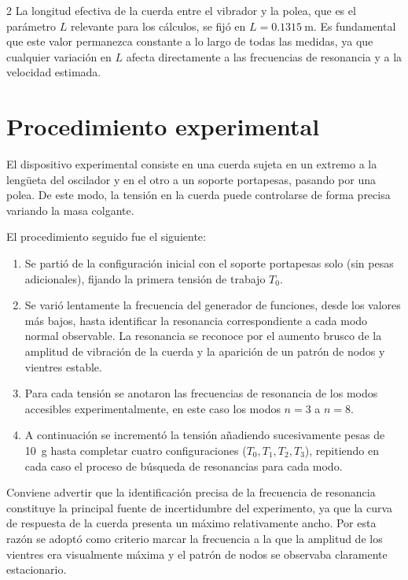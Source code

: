 \documentclass[12pt,a4paper]{article}
\newcommand{\Lutil}{\SI{0.1315}{\metre}}
\begin{document}
\begin{multicols}{2}
La longitud efectiva de la cuerda entre el vibrador y la polea, que es el parámetro $L$ relevante para los cálculos, se fijó en $L = \Lutil$. Es fundamental que este valor permanezca constante a lo largo de todas las medidas, ya que cualquier variación en $L$ afecta directamente a las frecuencias de resonancia y a la velocidad estimada.

\section{Procedimiento experimental}

El dispositivo experimental consiste en una cuerda sujeta en un extremo a la lengüeta del oscilador y en el otro a un soporte portapesas, pasando por una polea. De este modo, la tensión en la cuerda puede controlarse de forma precisa variando la masa colgante.

El procedimiento seguido fue el siguiente:

\begin{enumerate}
  \item Se partió de la configuración inicial con el soporte portapesas solo (sin pesas adicionales), fijando la primera tensión de trabajo $T_0$.
  \item Se varió lentamente la frecuencia del generador de funciones, desde los valores más bajos, hasta identificar la resonancia correspondiente a cada modo normal observable. La resonancia se reconoce por el aumento brusco de la amplitud de vibración de la cuerda y la aparición de un patrón de nodos y vientres estable.
  \item Para cada tensión se anotaron las frecuencias de resonancia de los modos accesibles experimentalmente, en este caso los modos $n = 3$ a $n = 8$.
  \item A continuación se incrementó la tensión añadiendo sucesivamente pesas de \SI{10}{\gram} hasta completar cuatro configuraciones ($T_0, T_1, T_2, T_3$), repitiendo en cada caso el proceso de búsqueda de resonancias para cada modo.
\end{enumerate}

Conviene advertir que la identificación precisa de la frecuencia de resonancia constituye la principal fuente de incertidumbre del experimento, ya que la curva de respuesta de la cuerda presenta un máximo relativamente ancho. Por esta razón se adoptó como criterio marcar la frecuencia a la que la amplitud de los vientres era visualmente máxima y el patrón de nodos se observaba claramente estacionario.


\end{multicols}
\end{document}
